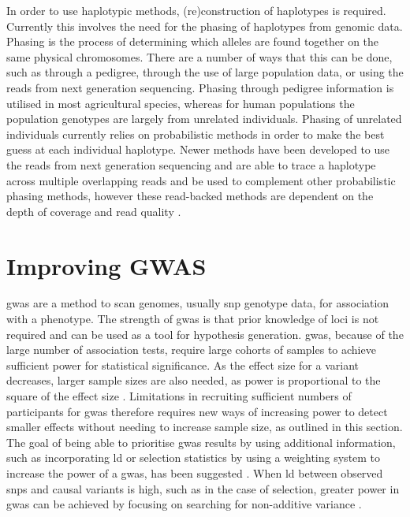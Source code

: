 \documentclass[]{report}
\begin{document}
In order to use haplotypic methods, (re)construction of haplotypes is
required. Currently this involves the need for the phasing of haplotypes
from genomic data. Phasing is the process of determining which alleles
are found together on the same physical chromosomes. There are a number
of ways that this can be done, such as through a pedigree, through the
use of large population data, or using the reads from next generation
sequencing. Phasing through pedigree information is utilised in most
agricultural species, whereas for human populations the population
genotypes are largely from unrelated individuals. Phasing of unrelated
individuals currently relies on probabilistic methods
\citep{Browning2009, Delaneau2012, Delaneau2013} in order to make the
best guess at each individual haplotype. Newer methods have been
developed to use the reads from next generation sequencing and are able
to trace a haplotype across multiple overlapping reads and be used to
complement other probabilistic phasing methods, however these
read-backed methods are dependent on the depth of coverage and read
quality \citep{Delaneau2014}.

\section{Improving GWAS}\label{improving-gwas}

\Gls{gwas} are a method to scan genomes, usually \gls{snp} genotype
data, for association with a phenotype. The strength of \gls{gwas} is
that prior knowledge of loci is not required and can be used as a tool
for hypothesis generation. \Gls{gwas}, because of the large number of
association tests, require large cohorts of samples to achieve
sufficient power for statistical significance. As the effect size for a
variant decreases, larger sample sizes are also needed, as power is
proportional to the square of the effect size
\citep{Korte2013, Hemani2013}. Limitations in recruiting sufficient
numbers of participants for \gls{gwas} therefore requires new ways of
increasing power to detect smaller effects without needing to increase
sample size, as outlined in this section. The goal of being able to
prioritise \gls{gwas} results by using additional information, such as
incorporating \gls{ld} or selection statistics by using a weighting
system to increase the power of a \gls{gwas}, has been suggested
\citep{Ayodo2007, Roeder2006}. When \gls{ld} between observed
\glspl{snp} and causal variants is high, such as in the case of
selection, greater power in \gls{gwas} can be achieved by focusing on
searching for non-additive variance \citep{Hemani2013}.
\end{document}
